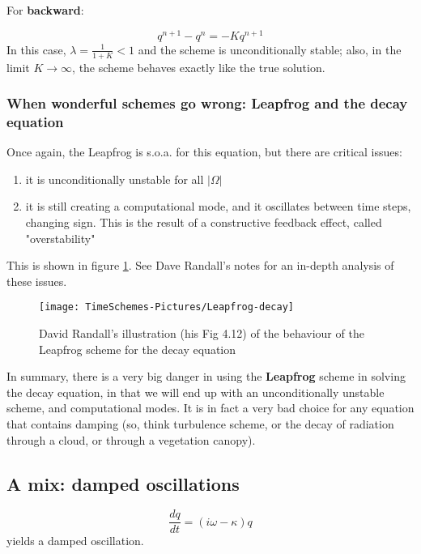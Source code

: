 For {\bf backward}:

\begin{equation}
	q^{n+1} -q^n = -K q^{n+1}
	\label{decay-solution-implicit}
\end{equation}
In this case, $\lambda = \frac{1}{1+K}<1$ and the scheme is unconditionally stable; also, in the limit $K \rightarrow \infty$, the scheme behaves exactly like the true solution.


\subsubsection{When wonderful schemes go wrong: Leapfrog and the decay equation}
Once again, the Leapfrog is s.o.a. for this equation, but there are critical issues:
\begin{enumerate}
	\item it is unconditionally unstable for all $|\Omega|$
	\item it is still creating a computational mode, and it oscillates between time steps, changing sign. This is the result of a constructive feedback effect, called "overstability"
	\end{enumerate}
This is shown in figure \ref{fig:Leapfrog-decay}. See Dave Randall's notes for an in-depth analysis of these issues.

\begin{figure}[h!]
	\texttt{[image: TimeSchemes-Pictures/Leapfrog-decay]}
	\caption{David Randall's illustration (his Fig 4.12) of the behaviour of the Leapfrog scheme for the decay equation}
	\label{fig:Leapfrog-decay}
\end{figure}

In summary, there is a very big danger in using the {\bf Leapfrog} scheme in solving the decay equation, in that we will end up with an unconditionally unstable scheme, and computational modes. It is in fact a very bad choice for any equation that contains damping (so, think turbulence scheme, or the decay of radiation through a cloud, or through a vegetation canopy).
 
\subsection{A mix: damped oscillations}

\begin{equation}
	\frac{dq}{dt}= (i\omega - \kappa) q
	\label{decay}
\end{equation}
yields a damped oscillation.

